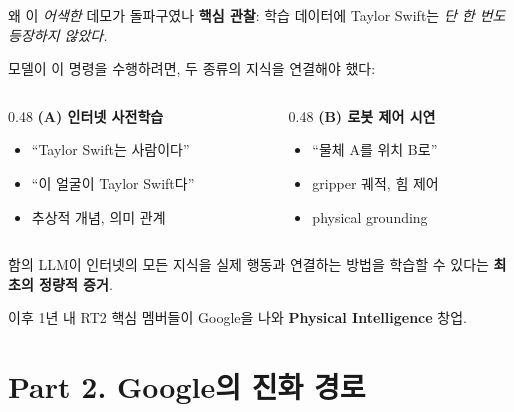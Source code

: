 \documentclass[aspectratio=169,10pt]{beamer}
\begin{document}
\begin{frame}{왜 이 \textit{어색한} 데모가 돌파구였나}
\textbf{핵심 관찰}: 학습 데이터에 Taylor Swift는 \emph{단 한 번도 등장하지 않았다.}

\vspace{0.5em}
모델이 이 명령을 수행하려면, 두 종류의 지식을 \alert{연결}해야 했다:

\vspace{0.3em}
\begin{columns}[T]
\begin{column}{0.48\textwidth}
\textbf{(A) 인터넷 사전학습}
\begin{itemize}
  \item ``Taylor Swift는 사람이다''
  \item ``이 얼굴이 Taylor Swift다''
  \item 추상적 개념, 의미 관계
\end{itemize}
\end{column}
\begin{column}{0.48\textwidth}
\textbf{(B) 로봇 제어 시연}
\begin{itemize}
  \item ``물체 A를 위치 B로''
  \item gripper 궤적, 힘 제어
  \item physical grounding
\end{itemize}
\end{column}
\end{columns}

\vspace{0.6em}
\begin{block}{함의}
LLM이 \alert{인터넷의 모든 지식}을 \alert{실제 행동}과 연결하는 방법을 학습할 수 있다는 \textbf{최초의 정량적 증거}.
\end{block}

\vspace{0.3em}
\footnotesize
이후 1년 내 RT2 핵심 멤버들이 Google을 나와 \textbf{Physical Intelligence} 창업.
\end{frame}

\section{Part 2. Google의 진화 경로}
\end{document}
